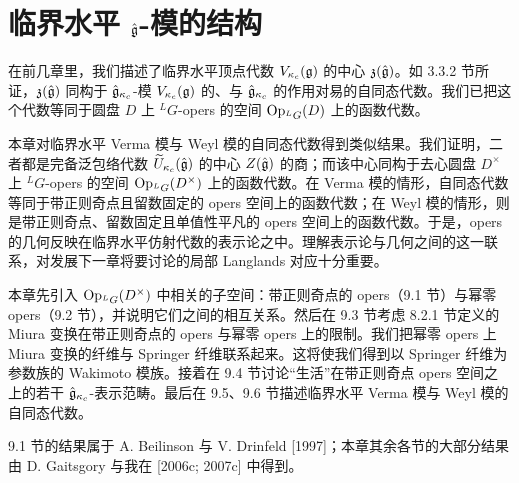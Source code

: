 
\chapter{临界水平 $\hat{\mathfrak{g}}$-模的结构}

在前几章里，我们描述了临界水平顶点代数 $V_{\kappa_c}(\mathfrak{g})$ 的中心 $\mathfrak{z}(\hat{\mathfrak{g}})$。如 3.3.2 节所证，$\mathfrak{z}(\hat{\mathfrak{g}})$ 同构于 $\hat{\mathfrak{g}}_{\kappa_c}$-模 $V_{\kappa_c}(\mathfrak{g})$ 的、与 $\hat{\mathfrak{g}}_{\kappa_c}$ 的作用对易的自同态代数。我们已把这个代数等同于圆盘 $D$ 上 ${}^L G$-opers 的空间 $\operatorname{Op}_{{}^L G}(D)$ 上的函数代数。

本章对临界水平 Verma 模与 Weyl 模的自同态代数得到类似结果。我们证明，二者都是完备泛包络代数 $\widetilde{U}_{\kappa_c}(\hat{\mathfrak{g}})$ 的中心 $Z(\hat{\mathfrak{g}})$ 的商；而该中心同构于去心圆盘 $D^\times$ 上 ${}^L G$-opers 的空间 $\operatorname{Op}_{{}^L G}(D^\times)$ 上的函数代数。在 Verma 模的情形，自同态代数等同于带正则奇点且留数固定的 opers 空间上的函数代数；在 Weyl 模的情形，则是带正则奇点、留数固定且单值性平凡的 opers 空间上的函数代数。于是，opers 的几何反映在临界水平仿射代数的表示论之中。理解表示论与几何之间的这一联系，对发展下一章将要讨论的局部 Langlands 对应十分重要。

本章先引入 $\operatorname{Op}_{{}^L G}(D^\times)$ 中相关的子空间：带正则奇点的 opers（9.1 节）与幂零 opers（9.2 节），并说明它们之间的相互关系。然后在 9.3 节考虑 8.2.1 节定义的 Miura 变换在带正则奇点的 opers 与幂零 opers 上的限制。我们把幂零 opers 上 Miura 变换的纤维与 Springer 纤维联系起来。这将使我们得到以 Springer 纤维为参数族的 Wakimoto 模族。接着在 9.4 节讨论“生活”在带正则奇点 opers 空间之上的若干 $\hat{\mathfrak{g}}_{\kappa_c}$-表示范畴。最后在 9.5、9.6 节描述临界水平 Verma 模与 Weyl 模的自同态代数。

9.1 节的结果属于 A. Beilinson 与 V. Drinfeld [1997]；本章其余各节的大部分结果由 D. Gaitsgory 与我在 [2006c; 2007c] 中得到。

